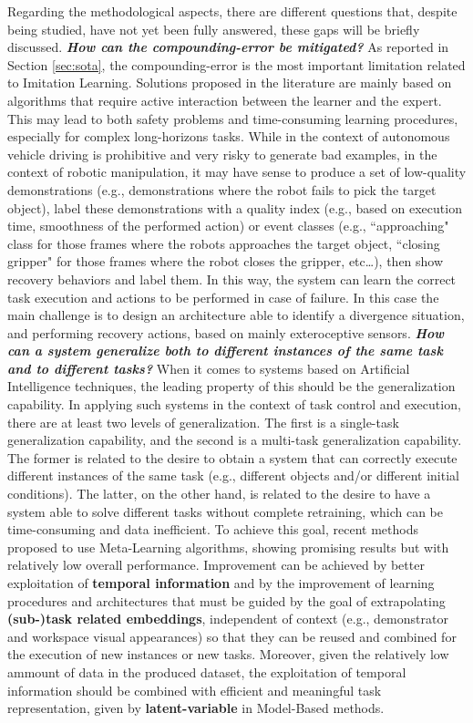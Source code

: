 Regarding the methodological aspects, there are different questions that, despite being studied, have not yet been fully answered, these gaps will be briefly discussed.
\newline \textbf{\textit{How can the compounding-error be mitigated?}} As reported in Section \ref{sec:sota}, the compounding-error is the most important limitation related to Imitation Learning. Solutions proposed in the literature are mainly based on algorithms that require active interaction between the learner and the expert. This may lead to both safety problems and time-consuming learning procedures, especially for complex long-horizons tasks. While in the context of autonomous vehicle driving is prohibitive and very risky to generate bad examples, in the context of robotic manipulation, it may have sense to produce a set of low-quality demonstrations (e.g., demonstrations where the robot fails to pick the target object), label these demonstrations with a quality index (e.g., based on execution time, smoothness of the performed action) or event classes (e.g., ``approaching" class for those frames where the robots approaches the target object, ``closing gripper" for those frames where the robot closes the gripper, etc\dots), then show recovery behaviors and label them. In this way, the system can learn the correct task execution and actions to be performed in case of failure. In this case the main challenge is to design an architecture able to identify a divergence situation, and performing recovery actions, based on mainly exteroceptive sensors. 
\newline \textbf{\textit{How can a system generalize both to different instances of the same task and to different tasks?}} When it comes to systems based on Artificial Intelligence techniques, the leading property of this should be the generalization capability. In applying such systems in the context of task control and execution, there are at least two levels of generalization. The first is a single-task generalization capability, and the second is a multi-task generalization capability. The former is related to the desire to obtain a system that can correctly execute different instances of the same task (e.g., different objects and/or different initial conditions). The latter, on the other hand, is related to the desire to have a system able to solve different tasks without complete retraining, which can be time-consuming and data inefficient. To achieve this goal, recent methods proposed to use Meta-Learning algorithms, showing promising results but with relatively low overall performance. Improvement can be achieved by better exploitation of \textbf{temporal information} and by the improvement of learning procedures and architectures that must be guided by the goal of extrapolating \textbf{(sub-)task related embeddings}, independent of context (e.g., demonstrator and workspace visual appearances) so that they can be reused and combined for the execution of new instances or new tasks. Moreover, given the relatively low ammount of data in the produced dataset, the exploitation of temporal information should be combined with efficient and meaningful task representation, given by \textbf{latent-variable} in Model-Based methods.
